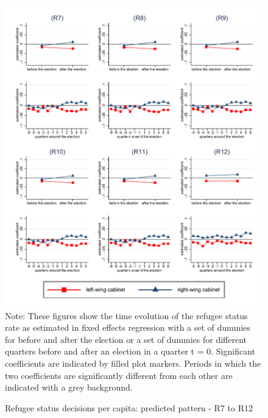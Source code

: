 \documentclass[11pt,a4paper]{scrartcl}
\begin{document}
\clearpage
\FloatBarrier



\clearpage
\FloatBarrier





\clearpage
\FloatBarrier


\clearpage
\FloatBarrier
\begin{figure}[!ht]
	\caption{Refugee status decisions per capita: predicted pattern - R7 to R12}
	\includegraphics[width=1\textwidth]{../results/decisions/refugeestatus_rate_graphs_R7-R12.pdf}
	\scriptsize{Note: These figures show the time evolution of the refugee status rate as estimated in fixed effects regression with a set of dummies for before and after the election or a set of dummies for different quarters before and after an election in a quarter t = 0. Significant coefficients are indicated by filled plot markers. Periods in which the two coefficients are significantly different from each other are indicated with a grey background.}
\end{figure}
\end{document}
